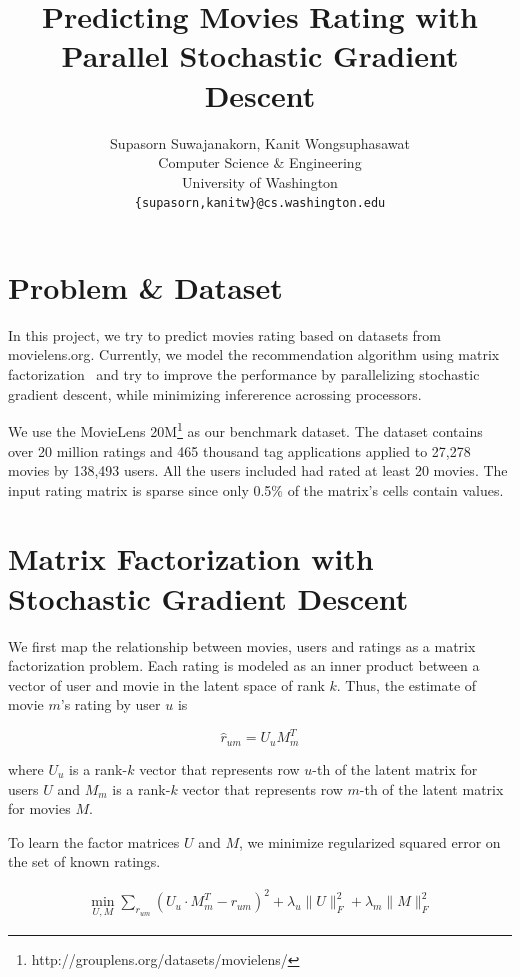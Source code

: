 \documentclass{article} %
\title{Predicting Movies Rating with Parallel Stochastic Gradient Descent}
\author{
Supasorn Suwajanakorn, Kanit Wongsuphasawat \\
Computer Science \& Engineering\\
University of Washington\\
\texttt{\{supasorn,kanitw\}@cs.washington.edu} \\
}
\newcommand{\U}{U}
\newcommand{\M}{M}
\begin{document}
\maketitle


\section{Problem \& Dataset}

In this project, we try to predict movies rating based on datasets from
movielens.org.  Currently, we model the recommendation algorithm using matrix
factorization~\cite{koren:matrix} and try to improve the performance by parallelizing stochastic gradient descent, while minimizing infererence acrossing processors.

We use the MovieLens 20M\footnote{http://grouplens.org/datasets/movielens/}
as our benchmark dataset.  The dataset contains over 20 million ratings and 465 thousand tag applications applied to 27,278 movies by 138,493 users.
All the users included had rated at least 20 movies.  The input rating matrix is sparse since only 0.5\% of the matrix's cells contain values.

\section{Matrix Factorization with Stochastic Gradient Descent}

We first map the relationship between movies, users and ratings
as a matrix factorization problem.
Each rating is modeled as an inner product between a vector of user and movie in the latent space of rank $k$.  Thus, the estimate of movie $m$'s rating by user $u$ is

\[
  \hat{r}_{um} = \U_u \M_m^T
\]

where $\U_u$ is a rank-$k$ vector that represents row $u$-th of the latent matrix for users $\U$ and $\M_m$ is a rank-$k$ vector that represents row $m$-th of the latent matrix for movies $\M$.

To learn the factor matrices $\U$ and $\M$, we minimize regularized squared error on the set of known ratings.

\begin{align}
  \min_{\U,\M} \sum_{r_{um}} (\U_u \cdot \M_m^T - r_{um})^2
  + \lambda_u \|\U\|^2_F + \lambda_m \|\M\|^2_F
\end{align}
\end{document}
